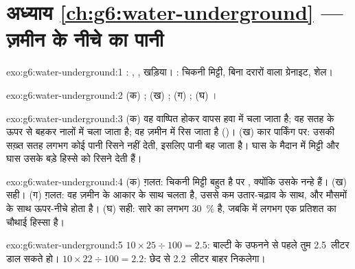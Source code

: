 \section*{अध्याय \ref{ch:g6:water-underground} --- ज़मीन के नीचे का पानी}

\begin{solution}{exo:g6:water-underground:1}
: , , खड़िया। : चिकनी मिट्टी, बिना दरारों वाला ग्रेनाइट,
शेल।
\end{solution}

\begin{solution}{exo:g6:water-underground:2}
(क) ; (ख) ; (ग) ; (घ) ।
\end{solution}

\begin{solution}{exo:g6:water-underground:3}
(क) वह वाष्पित होकर वापस हवा में चला जाता है; वह सतह के ऊपर से बहकर नालों में
चला जाता है; वह ज़मीन में रिस जाता है ()। (ख) कार पार्किंग पर: उसकी
सख़्त सतह लगभग कोई पानी रिसने नहीं देती, इसलिए पानी बह जाता है। घास के मैदान में
मिट्टी और घास उसके बड़े हिस्से को रिसने देती हैं।
\end{solution}

\begin{solution}{exo:g6:water-underground:4}
(क) ग़लत: चिकनी मिट्टी बहुत  है पर , क्योंकि उसके  नन्हे हैं।
(ख) सही। (ग) ग़लत: वह ज़मीन के आकार के साथ चलता है, उससे कम उतार-चढ़ाव के साथ,
और मौसमों के साथ ऊपर-नीचे होता है। (घ) सही: सारे  का लगभग 30~\%
 है, जबकि  में लगभग एक प्रतिशत का चौथाई हिस्सा है।
\end{solution}

\begin{solution}{exo:g6:water-underground:5}
$10 \times 25 \div 100 = 2.5$: बाल्टी के उफनने से पहले तुम 2.5~लीटर डाल सकते हो।
$10 \times 22 \div 100 = 2.2$: छेद से 2.2~लीटर बाहर निकलेगा।
\end{solution}

